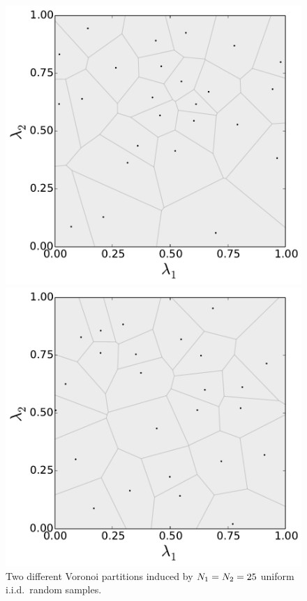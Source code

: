 \begin{figure}[ht]
\centering
	\begin{minipage}{.4875\textwidth}
		\includegraphics[width=\linewidth]{./images/voronoi_diagram_N25_r0}
	\end{minipage}
	\begin{minipage}{.4875\textwidth}
		\includegraphics[width=\linewidth]{./images/voronoi_diagram_N25_r10}
	\end{minipage}
\caption{
Two different Voronoi partitions induced by $N_1 = N_2 = 25 $ uniform i.i.d.~random samples.
}
\label{fig:voronoi_issues}
\end{figure}


